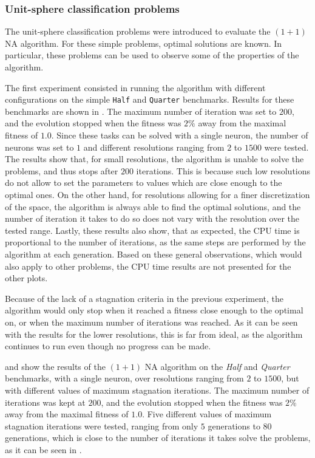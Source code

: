 \subsubsection{Unit-sphere classification problems}

The unit-sphere classification problems \cite{na} were introduced to evaluate the $(1 + 1)$ NA algorithm. For these simple problems, optimal solutions are known. In particular, these
problems can be used to observe some of the properties of the algorithm.

The first experiment consisted in running the algorithm with different configurations on the simple \texttt{Half} and \texttt{Quarter} benchmarks.
Results for these benchmarks are shown in . The maximum number of iteration was set to $200$, and the evolution stopped when the fitness
was $2\%$ away from the maximal fitness of $1.0$. Since these tasks can be solved with a single neuron, the number of neurons was set to $1$ and different resolutions ranging
from $2$ to $1500$ were tested. The results show that, for small resolutions, the algorithm is unable to solve the problems, and thus stops after $200$ iterations. This is
because such low resolutions do not allow to set the parameters to values which are close enough to the optimal ones. On the other hand,
for resolutions allowing for a finer discretization of the space, the algorithm is always able to find the optimal solutions, and the number of iteration it takes to do so
does not vary with the resolution over the tested range. Lastly, these results also show, that as expected, the CPU time is proportional to the number of iterations,
as the same steps are performed by the algorithm at each generation.
Based on these general observations, which would also apply to other problems, the CPU time results are not presented for the other plots.

Because of the lack of a stagnation criteria in the previous experiment, the algorithm would only stop when it reached a fitness close enough to the optimal on, or when
the maximum number of iterations was reached. As it can be seen with the results for the lower resolutions, this is far from ideal, as the algorithm continues to run even
though no progress can be made.

 and  show the results of the $(1 + 1)$ NA algorithm on the \textit{Half} and \textit{Quarter} benchmarks, with a single neuron, over
resolutions ranging from $2$ to $1500$, but with different values of maximum stagnation iterations. The maximum number of iterations was kept at $200$, and the evolution stopped when the fitness
was $2\%$ away from the maximal fitness of $1.0$. Five different values of maximum stagnation iterations were tested, ranging from only $5$ generations to $80$ generations, which is close to
the number of iterations it takes solve the problems, as it can be seen in .

